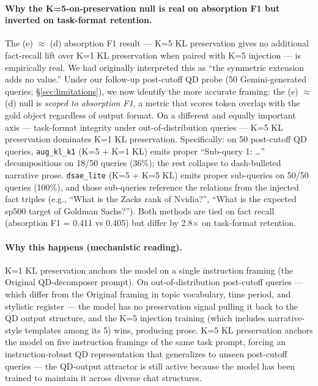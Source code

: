 \documentclass[11pt]{article}
\newcommand{\code}[1]{\texttt{\small #1}}
\begin{document}
\paragraph{Why the K=5-on-preservation null is real on absorption F1 but inverted on task-format retention.}
The (e) $\approx$ (d) absorption F1 result --- K=5 KL preservation gives
no additional fact-recall lift over K=1 KL preservation when paired with
K=5 injection --- is empirically real. We had originally interpreted
this as ``the symmetric extension adds no value.'' Under our follow-up
post-cutoff QD probe (50 Gemini-generated queries; \S\ref{sec:limitations}),
we now identify the more accurate framing: the (e) $\approx$ (d) null is
\emph{scoped to absorption F1}, a metric that scores token overlap with
the gold object regardless of output format. On a different and equally
important axis --- task-format integrity under out-of-distribution
queries --- K=5 KL preservation dominates K=1 KL preservation.
Specifically: on 50 post-cutoff QD queries, \code{aug\_kl\_k1}
(K=5 + K=1 KL) emits proper ``Sub-query 1: \dots'' decompositions on
18/50 queries (36\%); the rest collapse to dash-bulleted narrative
prose. \code{dsae\_lite} (K=5 + K=5 KL) emits proper sub-queries on
50/50 queries (100\%), and those sub-queries reference the relations
from the injected fact triples (e.g., ``What is the Zacks rank of
Nvidia?'', ``What is the expected sp500 target of Goldman Sachs?'').
Both methods are tied on fact recall (absorption F1 = 0.411 vs 0.405)
but differ by 2.8$\times$ on task-format retention.

\paragraph{Why this happens (mechanistic reading).}
K=1 KL preservation anchors the model on a single instruction framing
(the Original QD-decomposer prompt). On out-of-distribution post-cutoff
queries --- which differ from the Original framing in topic vocabulary,
time period, and stylistic register --- the model has no preservation
signal pulling it back to the QD output structure, and the K=5 injection
training (which includes narrative-style templates among its 5) wins,
producing prose. K=5 KL preservation anchors the model on five
instruction framings of the same task prompt, forcing an
instruction-robust QD representation that generalizes to unseen
post-cutoff queries --- the QD-output attractor is still active because
the model has been trained to maintain it across diverse chat
structures.
\end{document}
